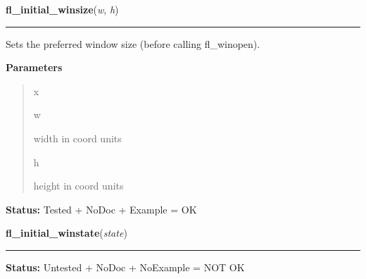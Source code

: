\hspace{.8\funcindent}\begin{boxedminipage}{\funcwidth}

    \raggedright \textbf{fl\_initial\_winsize}(\textit{w}, \textit{h})

    \vspace{-1.5ex}

    \rule{\textwidth}{0.5\fboxrule}
\setlength{\parskip}{2ex}
    Sets the preferred window size (before calling fl\_winopen).

\setlength{\parskip}{1ex}
      \textbf{Parameters}
      \vspace{-1ex}

      \begin{quote}
        \begin{Ventry}{x}

          \item[w]

          width in coord units

          \item[h]

          height in coord units

        \end{Ventry}

      \end{quote}

\textbf{Status:} Tested + NoDoc + Example = OK



    \end{boxedminipage}

    \label{xformslib:library:fl_initial_winstate}

    \vspace{0.5ex}

\hspace{.8\funcindent}\begin{boxedminipage}{\funcwidth}

    \raggedright \textbf{fl\_initial\_winstate}(\textit{state})

    \vspace{-1.5ex}

    \rule{\textwidth}{0.5\fboxrule}
\setlength{\parskip}{2ex}
\setlength{\parskip}{1ex}
\textbf{Status:} Untested + NoDoc + NoExample = NOT OK



    \end{boxedminipage}

